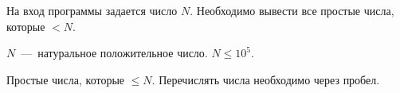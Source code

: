 На вход программы задается число $N$. Необходимо вывести все простые числа, которые $< N$. 

\InputFile

$N$~---~натуральное положительное число. $N \leq 10^5$.

\OutputFile

Простые числа, которые $\leq N$. Перечислять числа необходимо через пробел.

\SAMPLES

